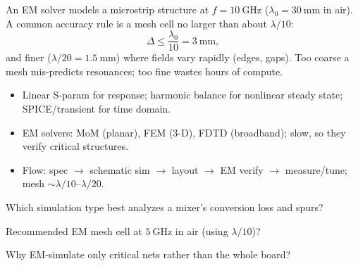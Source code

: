 \begin{workedexample}
An EM solver models a microstrip structure at $f = 10\ \text{GHz}$
($\lambda_0 = 30\ \text{mm}$ in air). A common accuracy rule is a mesh cell no
larger than about $\lambda/10$:
\[ \Delta \le \frac{\lambda_0}{10} = 3\ \text{mm}, \]
and finer ($\lambda/20 = 1.5\ \text{mm}$) where fields vary rapidly (edges, gaps).
Too coarse a mesh mis-predicts resonances; too fine wastes hours of compute.
\end{workedexample}

\begin{keytakeaways}
\begin{itemize}[leftmargin=1.4em,itemsep=2pt]
\item Linear S-param for response; harmonic balance for nonlinear steady state; SPICE/transient for time domain.
\item EM solvers: MoM (planar), FEM (3-D), FDTD (broadband); slow, so they verify critical structures.
\item Flow: spec $\to$ schematic sim $\to$ layout $\to$ EM verify $\to$ measure/tune; mesh $\sim\lambda/10$--$\lambda/20$.
\end{itemize}
\end{keytakeaways}

\begin{exercises}
\item Which simulation type best analyzes a mixer's conversion loss and spurs?
\item Recommended EM mesh cell at $5\ \text{GHz}$ in air (using $\lambda/10$)?
\item Why EM-simulate only critical nets rather than the whole board?
\end{exercises}

